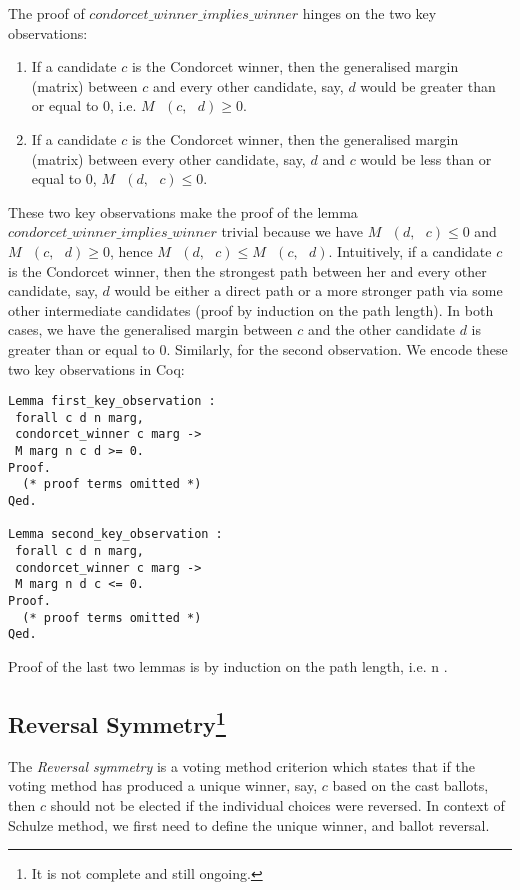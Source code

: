 \documentclass[compsoc,conference,a4paper,10pt,times]{IEEEtran}
\begin{document}
  		
 The proof of $condorcet\_winner\_implies\_winner$ hinges on the two key observations:
 
 \begin{enumerate}
  \item If a candidate $c$ is the Condorcet winner, then the generalised margin (matrix) 
  between $c$
  and every other candidate, say, $d$ would be greater than or equal to 0, i.e. 
  $M \text{ } (c, \text{ }d) \geq 0$.
  
  \item If a candidate $c$ is the Condorcet winner, then the generalised margin  (matrix)
  between every other candidate, say, $d$ and $c$ would be less than or equal to 0, 
  $M \text{ } (d, \text{ }c) \leq 0$.
 \end{enumerate}
 
 
 These two key observations make the proof of the lemma $condorcet\_winner\_implies\_winner$ 
 trivial because we have $M \text{ } (d, \text{ }c) \leq 0$  and
  $M \text{ } (c, \text{ }d) \geq 0$, hence $M \text{ } (d, \text{ }c)  \leq 
   M \text{ } (c, \text{ }d)$. Intuitively, 
 if a candidate $c$ is the Condorcet winner, then the strongest path between her and every other 
 candidate, say, $d$ would be either a direct path or a more stronger path 
 via some other intermediate candidates (proof by induction on the path length). 
 In both cases, we have the generalised margin between 
 $c$ and the other candidate $d$ is greater than or equal to 0. 
 Similarly, for the second observation. We encode these two key observations in 
 Coq:
 
 \begin{verbatim}
Lemma first_key_observation : 
 forall c d n marg, 
 condorcet_winner c marg -> 
 M marg n c d >= 0.
Proof.
  (* proof terms omitted *)
Qed.

Lemma second_key_observation : 
 forall c d n marg, 
 condorcet_winner c marg -> 
 M marg n d c <= 0.
Proof.
  (* proof terms omitted *)
Qed. 
 \end{verbatim}

Proof of the last two lemmas is by induction on the path length, i.e. n \cite{Carre:1971:ANR}. 







\subsection{Reversal Symmetry\footnote{It is not complete and still ongoing.}}
 The \textit{Reversal symmetry} is a voting method criterion which states that if the
 voting method has produced a unique 
  winner, say, $c$ based on the cast ballots, then $c$ should not be elected if the 
 individual choices were reversed. 
 In context of Schulze method, we first need to define the unique winner, and ballot reversal. 
 
\end{document}
